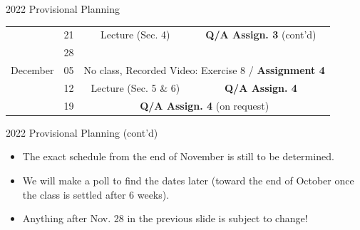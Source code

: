 \begin{frame}{2022 Provisional Planning}
\begin{table}[t]
\begin{center}
\begin{tabular}{|c|c|c|c|}
& 21 &   Lecture (Sec. 4) & \textbf{Q/A Assign. 3} (\alert{cont'd}) \\  \cline{2-4} \hhline{|~|---|}
 & 28  &  \multicolumn{2}{c|}{\cellcolor{cream}}  \\  \cline{1-2}
December         &  05  &  \multicolumn{2}{c|}{\multirow{-2}{*}{\cellcolor{cream} \alert{No class}, Recorded Video: Exercise 8 / \textbf{Assignment 4}}} \\ \cline{2-4}
        & 12 & Lecture (Sec. 5 \& 6) & \textbf{Q/A Assign. 4}  \\ \cline{2-4}
& 19 &   \multicolumn{2}{c|}{\textbf{Q/A Assign. 4} (on request)} \\ \hline
\end{tabular}
\end{center}
\end{table}




\end{frame}


\begin{frame}{2022 Provisional Planning (cont'd)}
\vspace{-5mm}
\begin{itemize}
\item The exact schedule from the end of November is still to be determined.
\item We will make a poll to find the dates later (toward the end of October once the class is settled after 6 weeks).
\item Anything after Nov. 28 in the previous slide is subject to change!
\end{itemize}
\end{frame}

